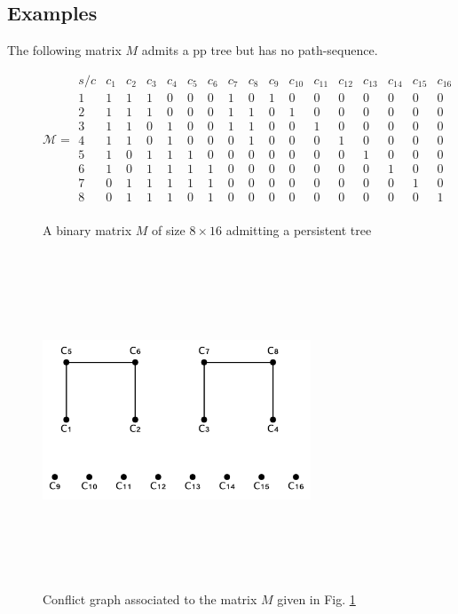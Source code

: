 \subsection{Examples}

The following matrix $M$ admits a pp tree but has no path-sequence.

\begin{figure}[htbp]
$$
     {\mathcal M} =
     \begin{array}{c|cccccccccccccccc}
     s/c & c_1 & c_2 & c_3 & c_4 & c_5 & c_6 & c_7 & c_8 & c_9 & c_{10} &
c_{11} & c_{12} & c_{13} & c_{14} & c_{15} & c_{16}\\
     \hline
     1 & 1 & 1 & 1 & 0 & 0 & 0 & 1 & 0 & 1 & 0 & 0 & 0 & 0 & 0 & 0 & 0 \\
	 2 & 1 & 1 & 1 & 0 & 0 & 0 & 1 & 1 & 0 & 1 & 0 & 0 & 0 & 0 & 0 & 0 \\
	 3 & 1 & 1 & 0 & 1 & 0 & 0 & 1 & 1 & 0 & 0 & 1 & 0 & 0 & 0 & 0 & 0 \\
	 4 & 1 & 1 & 0 & 1 & 0 & 0 & 0 & 1 & 0 & 0 & 0 & 1 & 0 & 0 & 0 & 0 \\
	 5 & 1 & 0 & 1 & 1 & 1 & 0 & 0 & 0 & 0 & 0 & 0 & 0 & 1 & 0 & 0 & 0 \\
	 6 & 1 & 0 & 1 & 1 & 1 & 1 & 0 & 0 & 0 & 0 & 0 & 0 & 0 & 1 & 0 & 0 \\
	 7 & 0 & 1 & 1 & 1 & 1 & 1 & 0 & 0 & 0 & 0 & 0 & 0 & 0 & 0 & 1 & 0 \\
	 8 & 0 & 1 & 1 & 1 & 0 & 1 & 0 & 0 & 0 & 0 & 0 & 0 & 0 & 0 & 0 & 1 \\
      \end{array}
$$
\caption{A binary matrix  $M$ of size  $8 \times 16$ admitting a persistent
tree}
\label{fig:matAmmetteP-pp}
\end{figure}

\begin{figure}[htbp]
\centering
\includegraphics[height=10cm, width=8cm,keepaspectratio]{GrafoConflitti1}
\caption{Conflict graph associated to the matrix  $M$ given in Fig.
\ref{fig:matAmmetteP-pp} }
\label{fig:GcM}
\end{figure}


